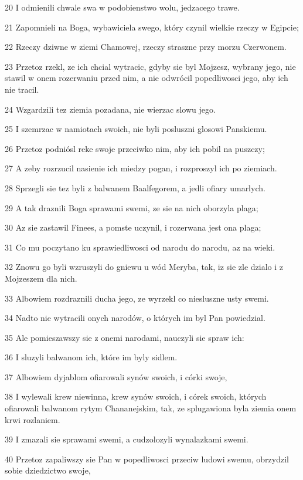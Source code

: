 \par 20 I odmienili chwale swa w podobienstwo wolu, jedzacego trawe.
\par 21 Zapomnieli na Boga, wybawiciela swego, który czynil wielkie rzeczy w Egipcie;
\par 22 Rzeczy dziwne w ziemi Chamowej, rzeczy straszne przy morzu Czerwonem.
\par 23 Przetoz rzekl, ze ich chcial wytracic, gdyby sie byl Mojzesz, wybrany jego, nie stawil w onem rozerwaniu przed nim, a nie odwrócil popedliwosci jego, aby ich nie tracil.
\par 24 Wzgardzili tez ziemia pozadana, nie wierzac slowu jego.
\par 25 I szemrzac w namiotach swoich, nie byli posluszni glosowi Panskiemu.
\par 26 Przetoz podniósl reke swoje przeciwko nim, aby ich pobil na puszczy;
\par 27 A zeby rozrzucil nasienie ich miedzy pogan, i rozproszyl ich po ziemiach.
\par 28 Sprzegli sie tez byli z balwanem Baalfegorem, a jedli ofiary umarlych.
\par 29 A tak draznili Boga sprawami swemi, ze sie na nich oborzyla plaga;
\par 30 Az sie zastawil Finees, a pomste uczynil, i rozerwana jest ona plaga;
\par 31 Co mu poczytano ku sprawiedliwosci od narodu do narodu, az na wieki.
\par 32 Znowu go byli wzruszyli do gniewu u wód Meryba, tak, iz sie zle dzialo i z Mojzeszem dla nich.
\par 33 Albowiem rozdraznili ducha jego, ze wyrzekl co niesluszne usty swemi.
\par 34 Nadto nie wytracili onych narodów, o których im byl Pan powiedzial.
\par 35 Ale pomieszawszy sie z onemi narodami, nauczyli sie spraw ich:
\par 36 I sluzyli balwanom ich, które im byly sidlem.
\par 37 Albowiem dyjablom ofiarowali synów swoich, i córki swoje,
\par 38 I wylewali krew niewinna, krew synów swoich, i córek swoich, których ofiarowali balwanom rytym Chananejskim, tak, ze splugawiona byla ziemia onem krwi rozlaniem.
\par 39 I zmazali sie sprawami swemi, a cudzolozyli wynalazkami swemi.
\par 40 Przetoz zapaliwszy sie Pan w popedliwosci przeciw ludowi swemu, obrzydzil sobie dziedzictwo swoje,
